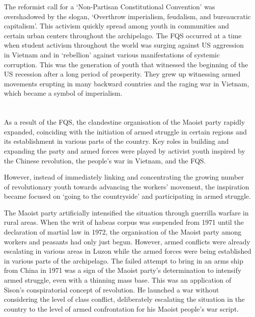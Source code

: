 The reformist call for a `Non-Partisan Constitutional Convention' 
was overshadowed by the slogan,
`Overthrow imperialism, feudalism, and bureaucratic capitalism'. 
This activism quickly spread among 
youth in communities and certain urban centers 
throughout the archipelago.
The FQS occurred at a time 
when student activism throughout the world was surging 
against US aggression in Vietnam 
and in `rebellion' against various manifestations of systemic corruption. 
This was the generation of youth 
that witnessed the beginning of the US recession 
after a long period of prosperity. 
They grew up witnessing armed movements 
erupting in many backward countries 
and the raging war in Vietnam, 
which became a symbol of imperialism.

\section{}
As a result of the FQS, 
the clandestine organisation of the Maoist party rapidly expanded, 
coinciding with the initiation of armed struggle in certain regions 
and its establishment in various parts of the country. 
Key roles in building and expanding the party and armed forces 
were played by activist youth 
inspired by the Chinese revolution, 
the people's war in Vietnam, 
and the FQS.

However, 
instead of immediately linking and concentrating 
the growing number of revolutionary youth 
towards advancing the workers' movement, 
the inspiration became focused on `going to the countryside' 
and participating in armed struggle.

The Maoist party artificially intensified the situation 
through guerrilla warfare in rural areas. 
When the writ of habeas corpus was suspended 
from 1971 until the declaration of martial law in 1972,
the organisation of the Maoist party among workers and peasants 
had only just begun. 
However, armed conflicts were already escalating 
in various areas in Luzon 
while the armed forces were being established 
in various parts of the archipelago. 
The failed attempt to bring in an arms ship from China in 1971 
was a sign of the Maoist party's determination 
to intensify armed struggle, 
even with a thinning mass base. 
This was an application of Sison's conspiratorial concept of revolution. 
He launched a war without considering 
the level of class conflict, 
deliberately escalating the situation in the country 
to the level of armed confrontation 
for his Maoist people's war script.

